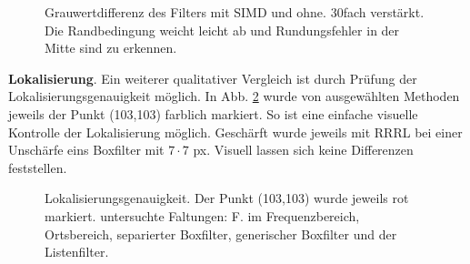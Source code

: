 \documentclass[a4paper,12pt]{article}
\begin{document}
\begin{figure}[htbp]
\caption{Grauwertdifferenz des Filters mit SIMD und ohne. 30fach verstärkt. Die
Randbedingung weicht leicht ab und Rundungsfehler in der Mitte sind zu erkennen. }%
\label{figure_hist_simd}
\end{figure}

\textbf{Lokalisierung}. Ein weiterer qualitativer Vergleich ist durch Prüfung
der Lokalisierungsgenauigkeit möglich. In Abb. \ref{figure_lokalisierung} wurde
von ausgewählten Methoden jeweils der Punkt (103,103) farblich markiert. 
So ist eine einfache visuelle
Kontrolle der Lokalisierung möglich. Geschärft wurde jeweils mit RRRL bei einer
Unschärfe eins Boxfilter mit $7 \cdot 7$ px. Visuell lassen sich keine
Differenzen feststellen.

\begin{figure}[htbp]
\caption{Lokalisierungsgenauigkeit. Der Punkt (103,103) wurde jeweils rot
markiert. untersuchte Faltungen: F. im Frequenzbereich, Ortsbereich,
separierter Boxfilter, generischer Boxfilter und der Listenfilter.}%
\label{figure_lokalisierung}
\end{figure}
\end{document}
